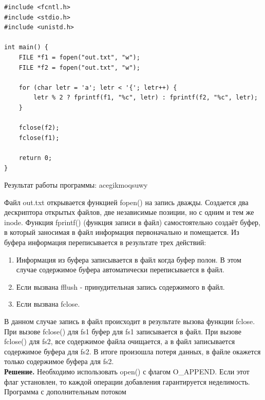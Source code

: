 \begin{lstlisting}
#include <fcntl.h>
#include <stdio.h>
#include <unistd.h>

int main() {
	FILE *f1 = fopen("out.txt", "w");
	FILE *f2 = fopen("out.txt", "w");
	
	for (char letr = 'a'; letr < '{'; letr++) {
		letr % 2 ? fprintf(f1, "%c", letr) : fprintf(f2, "%c", letr);
	}
		
	fclose(f2);
	fclose(f1);
	
	return 0;
}
\end{lstlisting}
Результат работы программы:\newline
acegikmoqsuwy

Файл out.txt открывается функцией fopen() на запись дважды. Создается два
дескриптора открытых файлов, две независимые позиции, но с одним и тем же
inode. Функция fprintf() (функция записи в файл) самостоятельно создаёт буфер,
в который заносимая в файл информация первоначально и помещается. Из буфера
информация переписывается в результате трех действий:
\begin{enumerate}
	\item Информация из буфера записывается в файл когда буфер полон. В
	этом случае содержимое буфера автоматически переписывается в файл.
	\item Если вызвана fflush - принудительная запись содержимого в файл.
	\item Если вызвана fclose.
\end{enumerate}
В данном случае запись в файл происходит в результате вызова функции fclose.
При вызове fclose() для fs1 буфер для fs1 записывается в файл. При вызове
fclose() для fs2, все содержимое файла очищается, а в файл записывается
содержимое буфера для fs2. В итоге произошла потеря данных, в файле окажется
только содержимое буфера для fs2. \\
\textbf{Решение.} Необходимо использовать open() с флагом O\_APPEND. Если этот
флаг установлен, то каждой операции добавления гарантируется неделимость. \\
Программа с дополнительным потоком
